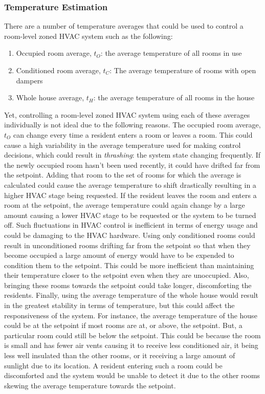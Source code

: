 \subsubsection{Temperature Estimation}
\label{sec:temperatureEstimation}
There are a number of temperature averages that could be used to control a
room-level zoned HVAC system such as the following:
\begin{enumerate}
\item Occupied room average, $t_O$: the average temperature of all rooms in use
\item Conditioned room average, $t_C$: The average temperature of rooms with open dampers
\item Whole house average, $t_H$: the average temperature of all rooms in the house
\end{enumerate}
Yet, controlling a room-level zoned HVAC system using each of these averages
individually is not ideal due to the following reasons. The occupied room
average, $t_O$ can change every time a resident enters a room or leaves a
room. This could cause a high variability in the average temperature used for
making control decisions, which could result in {\em thrashing}: the system
state changing frequently. If the newly occupied room hasn't been used recently,
it could have drifted far from the setpoint. Adding that room to the set of
rooms for which the average is calculated could cause the average temperature to
shift drastically resulting in a higher HVAC stage being requested. If the
resident leaves the room and enters a room at the setpoint, the average
temperature could again change by a large amount causing a lower HVAC stage to
be requested or the system to be turned off. Such fluctuations in HVAC control
is inefficient in terms of energy usage and could be damaging to the HVAC
hardware. Using only conditioned rooms could result in unconditioned rooms
drifting far from the setpoint so that when they become occupied a large amount
of energy would have to be expended to condition them to the setpoint. This
could be more inefficient than maintaining their temperature closer to the
setpoint even when they are unoccupied. Also, bringing these rooms towards the
setpoint could take longer, discomforting the residents. Finally, using the
average temperature of the whole house would result in the greatest stability in
terms of temperature, but this could affect the responsiveness of the
system. For instance, the average temperature of the house could be at the
setpoint if most rooms are at, or above, the setpoint. But, a particular room
could still be below the setpoint. This could be because the room is small and
has fewer air vents causing it to receive less conditioned air, it being less
well insulated than the other rooms, or it receiving a large amount of sunlight
due to its location. A resident entering such a room could be discomforted and
the system would be unable to detect it due to the other rooms skewing the
average temperature towards the setpoint.

